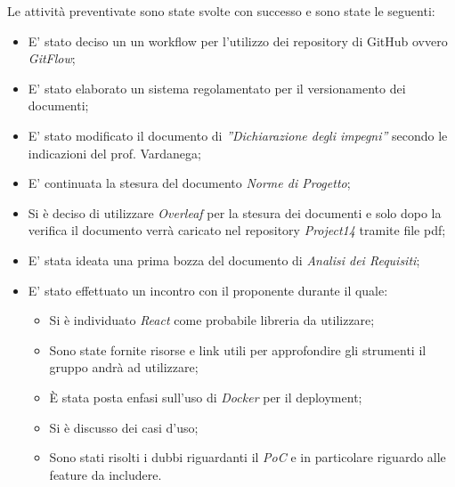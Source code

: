 Le attività preventivate sono state svolte con successo e sono state le seguenti:
\begin{itemize}
    \item E' stato deciso un un workflow per l'utilizzo dei repository di GitHub ovvero \emph{GitFlow};
    \item E' stato elaborato un sistema regolamentato per il versionamento dei documenti;
    \item E' stato modificato il documento di \emph{”Dichiarazione degli impegni”} secondo le indicazioni del prof. Vardanega;
    \item E' continuata la stesura del documento \emph{Norme di Progetto};
    \item Si è deciso di utilizzare \emph{Overleaf} per la stesura dei documenti e solo dopo la verifica il documento verrà caricato nel repository \emph{Project14} tramite file pdf;
    \item E' stata ideata una prima bozza del documento di \emph{Analisi dei Requisiti};
    \item E' stato effettuato un incontro con il proponente durante il quale:
    \begin{itemize}
        \item Si è individuato \emph{React} come probabile libreria da utilizzare;
        \item Sono state fornite risorse e link utili per approfondire gli strumenti il gruppo andrà ad utilizzare;
        \item È stata posta enfasi sull'uso di \emph{Docker} per il deployment;
        \item Si è discusso dei casi d'uso;
        \item Sono stati risolti i dubbi riguardanti il \emph{PoC} e in particolare riguardo alle feature da includere.
    \end{itemize}
\end{itemize}
